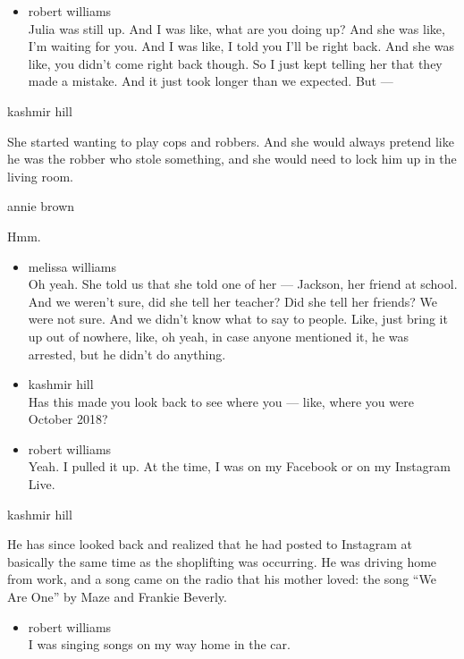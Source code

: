 \begin{itemize}
\tightlist
\item
  robert williams\\
  Julia was still up. And I was like, what are you doing up? And she was
  like, I'm waiting for you. And I was like, I told you I'll be right
  back. And she was like, you didn't come right back though. So I just
  kept telling her that they made a mistake. And it just took longer
  than we expected. But ---
\end{itemize}

kashmir hill

She started wanting to play cops and robbers. And she would always
pretend like he was the robber who stole something, and she would need
to lock him up in the living room.

annie brown

Hmm.

\begin{itemize}
\item
  melissa williams\\
  Oh yeah. She told us that she told one of her --- Jackson, her friend
  at school. And we weren't sure, did she tell her teacher? Did she tell
  her friends? We were not sure. And we didn't know what to say to
  people. Like, just bring it up out of nowhere, like, oh yeah, in case
  anyone mentioned it, he was arrested, but he didn't do anything.
\item
  kashmir hill\\
  Has this made you look back to see where you --- like, where you were
  October 2018?
\item
  robert williams\\
  Yeah. I pulled it up. At the time, I was on my Facebook or on my
  Instagram Live.
\end{itemize}

kashmir hill

He has since looked back and realized that he had posted to Instagram at
basically the same time as the shoplifting was occurring. He was driving
home from work, and a song came on the radio that his mother loved: the
song ``We Are One'' by Maze and Frankie Beverly.

\begin{itemize}
\tightlist
\item
  robert williams\\
  I was singing songs on my way home in the car.
\end{itemize}

